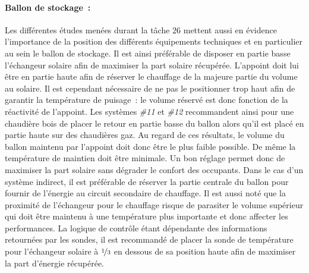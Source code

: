 \paragraph{Ballon de stockage~:} %
\label{par:ballon_de_stockage}
Les différentes études menées durant la tâche $26$ mettent aussi en évidence l’importance
de la position des différents équipements techniques et en particulier au sein le ballon
de stockage. Il est ainsi préférable de disposer en partie basse l’échangeur solaire
afin de maximiser la part solaire récupérée. L’appoint doit lui être en partie haute afin de réserver
le chauffage de la majeure partie du volume au solaire. Il est cependant nécessaire
de ne pas le positionner trop haut afin de garantir la température de puisage~: le volume
réservé est donc fonction de la réactivité de l’appoint. Les systèmes \emph{\#11} et
\emph{\#12} recommandent ainsi pour une chaudière bois de placer le retour en partie
basse du ballon alors qu’il est placé en partie haute sur des chaudières gaz.
Au regard de ces résultats, le volume du ballon maintenu par l’appoint doit donc
être le plus faible possible. De même la température de maintien doit être minimale.
Un bon réglage permet donc de maximiser la part solaire sans dégrader le confort des occupants.
Dans le cas d’un système indirect, il est préférable de réserver la partie centrale
du ballon
pour fournir de l’énergie au circuit secondaire de chauffage. Il est aussi noté que
la proximité de l’échangeur pour le chauffage risque de parasiter le volume supérieur
qui doit être maintenu à une température plus importante et donc affecter les performances.
La logique de contrôle étant dépendante des informations retournées par les sondes, il est
recommandé de placer la sonde de température pour l’échangeur solaire à $\nicefrac{1}{3}$
en dessous de sa position haute afin de maximiser la part d’énergie récupérée.


